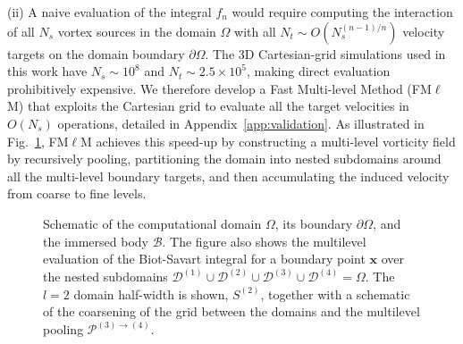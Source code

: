 \documentclass[lineno]{JFM-FLM_Au}
\begin{document}


(ii) A naive evaluation of the integral $f_n$ 
would require computing the interaction of all $N_s$ vortex sources in the domain $\Omega$ with all $N_t\sim O(N_s^{(n-1)/n})$ velocity targets on the domain boundary $\partial\Omega$. The 3D Cartesian-grid simulations used in this work have $N_s \sim 10^8$ and $N_t\sim 2.5\times 10^5$, making direct evaluation prohibitively expensive. 
We therefore develop a Fast Multi-level Method (FM$\ell$M) that exploits the Cartesian grid to evaluate all the target velocities in $O(N_s)$ operations, detailed in Appendix~\ref{app:validation}. As illustrated in Fig.~\ref{Fig_2}, FM$\ell$M achieves this speed-up by constructing a multi-level vorticity field by recursively pooling, partitioning the domain into nested subdomains around all the multi-level boundary targets, and then accumulating the induced velocity from coarse to fine levels. 

\begin{figure}
    \centering
    \vspace{2mm}
    \def\svgwidth{0.7\columnwidth}
    
    \caption{Schematic of the computational domain $\Omega$, its boundary $\partial\Omega$, and the immersed body $\mathcal{B}$. The figure also shows the multilevel evaluation of the Biot-Savart integral for a boundary point $\bm x$ over the nested subdomains $\mathcal{D}^{(1)} \cup \mathcal{D}^{(2)} \cup \mathcal{D}^{(3)} \cup \mathcal{D}^{(4)}=\Omega $. The $l=2$ domain half-width is shown, ${S}^{(2)}$, together with a schematic of the coarsening of the grid between the domains and the multilevel pooling $\mathcal{P}^{(3)\to(4)}$.}
    \label{Fig_2}
\end{figure}
\end{document}
